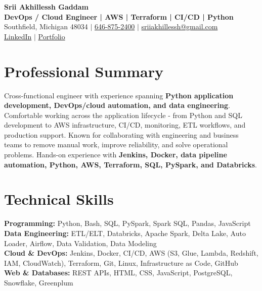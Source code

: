 \documentclass[letterpaper,10pt]{article}
\begin{document}
\fontsize{9.35pt}{10.45pt}\selectfont

\begin{center}
    {\LARGE \textbf{Srii Akhillessh Gaddam}} \\[-1pt]
    \textbf{DevOps / Cloud Engineer | AWS | Terraform | CI/CD | Python} \\[2pt]
    Southfield, Michigan 48034 $|$
    \href{tel:6468752400}{646-875-2400} $|$
    \href{mailto:sriiakhillessh@gmail.com}{sriiakhillessh@gmail.com} \\[1pt]
    \href{https://www.linkedin.com/in/srii-akhiilessh-gaddam-b48668191/}{LinkedIn} $|$
    \href{https://sriiakhillesshg.github.io/portfolio/}{Portfolio}
\end{center}
\vspace{-8pt}

\section{Professional Summary}
\small{Cross-functional engineer with experience spanning \textbf{Python application development, DevOps/cloud automation, and data engineering}. Comfortable working across the application lifecycle - from Python and SQL development to AWS infrastructure, CI/CD, monitoring, ETL workflows, and production support. Known for collaborating with engineering and business teams to remove manual work, improve reliability, and solve operational problems. Hands-on experience with \textbf{Jenkins, Docker, data pipeline automation, Python, AWS, Terraform, SQL, PySpark, and Databricks}.}

\section{Technical Skills}
\small{
\textbf{Programming:} Python, Bash, SQL, PySpark, Spark SQL, Pandas, JavaScript \\
\textbf{Data Engineering:} ETL/ELT, Databricks, Apache Spark, Delta Lake, Auto Loader, Airflow, Data Validation, Data Modeling \\
\textbf{Cloud \& DevOps:} Jenkins, Docker, CI/CD, AWS (S3, Glue, Lambda, Redshift, IAM, CloudWatch), Terraform, Git, Linux, Infrastructure as Code, GitHub \\
\textbf{Web \& Databases:} REST APIs, HTML, CSS, JavaScript, PostgreSQL, Snowflake, Greenplum
}
\end{document}
